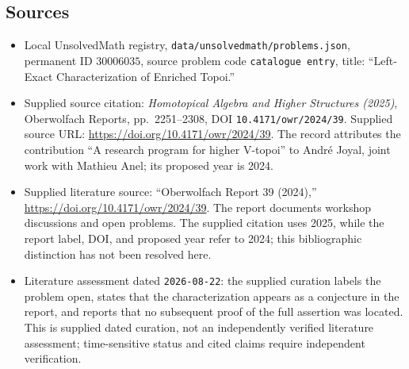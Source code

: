 \documentclass[11pt]{article}
\begin{document}
\subsection{Sources}
\begin{itemize}
\item Local UnsolvedMath registry, \texttt{data/unsolvedmath/problems.json}, permanent ID \(30006035\), source problem code \texttt{catalogue entry}, title: ``Left-Exact Characterization of Enriched Topoi.''
\item Supplied source citation: \emph{Homotopical Algebra and Higher Structures (2025)}, Oberwolfach Reports, pp.\ 2251--2308, DOI \texttt{10.4171/owr/2024/39}. Supplied source URL: \url{https://doi.org/10.4171/owr/2024/39}. The record attributes the contribution ``A research program for higher V-topoi'' to Andr\'e Joyal, joint work with Mathieu Anel; its proposed year is 2024.
\item Supplied literature source: ``Oberwolfach Report 39 (2024),'' \url{https://doi.org/10.4171/owr/2024/39}. The report documents workshop discussions and open problems. The supplied citation uses 2025, while the report label, DOI, and proposed year refer to 2024; this bibliographic distinction has not been resolved here.
\item Literature assessment dated \texttt{2026-08-22}: the supplied curation labels the problem open, states that the characterization appears as a conjecture in the report, and reports that no subsequent proof of the full assertion was located. This is supplied dated curation, not an independently verified literature assessment; time-sensitive status and cited claims require independent verification.
\end{itemize}
\end{document}
